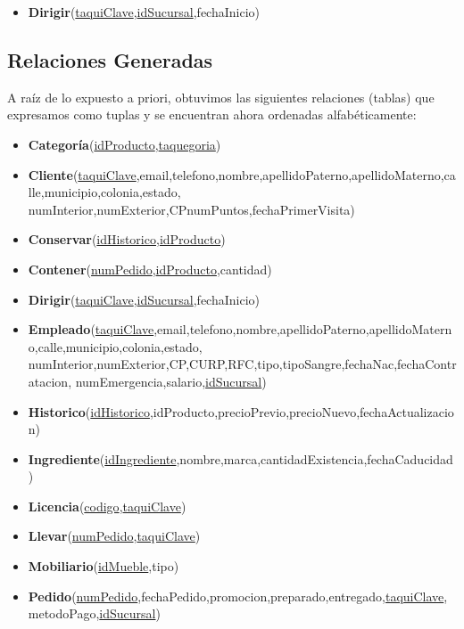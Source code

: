 \documentclass[11pt,letterpaper]{article}
\begin{document}
\begin{itemize}
\item \footnotesize{\textbf{Dirigir}(\underline{taquiClave},\underline{idSucursal},fechaInicio)}
\end{itemize}

\subsection{Relaciones Generadas}

A raíz de lo expuesto a priori, obtuvimos las siguientes relaciones (tablas) que expresamos como tuplas y se encuentran ahora ordenadas alfabéticamente:

\begin{itemize}
\item \footnotesize{\textbf{Categoría}(\underline{idProducto},\underline{taquegoria})}
\item \footnotesize{\textbf{Cliente}(\underline{taquiClave},email,telefono,nombre,apellidoPaterno,apellidoMaterno,calle,municipio,colonia,estado,
numInterior,numExterior,CPnumPuntos,fechaPrimerVisita)}
\item \footnotesize{\textbf{Conservar}(\underline{idHistorico},\underline{idProducto})}
\item \footnotesize{\textbf{Contener}(\underline{numPedido},\underline{idProducto},cantidad)}
\item \footnotesize{\textbf{Dirigir}(\underline{taquiClave},\underline{idSucursal},fechaInicio)}
\item \footnotesize{\textbf{Empleado}(\underline{taquiClave},email,telefono,nombre,apellidoPaterno,apellidoMaterno,calle,municipio,colonia,estado,
numInterior,numExterior,CP,CURP,RFC,tipo,tipoSangre,fechaNac,fechaContratacion,
numEmergencia,salario,\underline{idSucursal})}
\item \footnotesize{\textbf{Historico}(\underline{idHistorico},idProducto,precioPrevio,precioNuevo,fechaActualizacion)}
\item \footnotesize{\textbf{Ingrediente}(\underline{idIngrediente},nombre,marca,cantidadExistencia,fechaCaducidad)}
\item \footnotesize{\textbf{Licencia}(\underline{codigo},\underline{taquiClave}})
\item \footnotesize{\textbf{Llevar}(\underline{numPedido},\underline{taquiClave})}
\item \footnotesize{\textbf{Mobiliario}(\underline{idMueble},tipo)}
\item \footnotesize{\textbf{Pedido}(\underline{numPedido},fechaPedido,promocion,preparado,entregado,\underline{taquiClave},metodoPago,\underline{idSucursal})}

\end{itemize}
\end{document}
